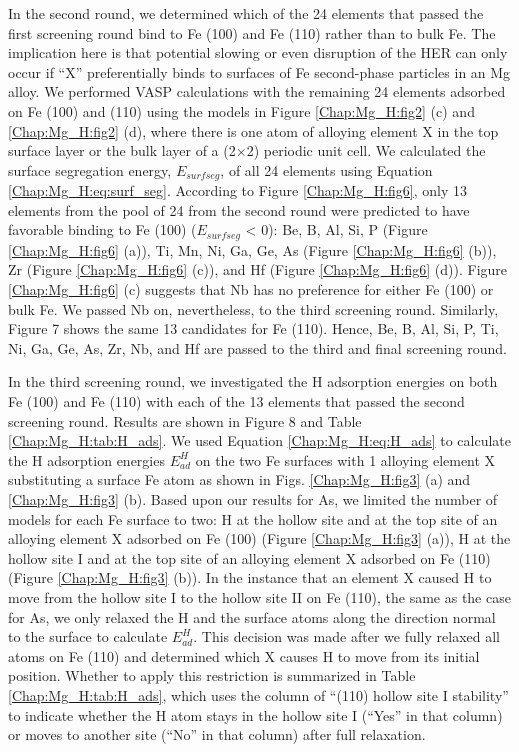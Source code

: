 In the second round, we determined which of the 24 elements that passed the first screening round bind to Fe (100) and Fe (110) rather than to bulk Fe. The implication here is that potential slowing or even disruption of the HER can only occur if ``X'' preferentially binds to surfaces of Fe second-phase particles in an Mg alloy. We performed \ac{VASP} calculations with the remaining 24 elements adsorbed on Fe (100) and (110) using the models in Figure \ref{Chap:Mg_H:fig2} (c) and \ref{Chap:Mg_H:fig2} (d), where there is one atom of alloying element X in the top surface layer or the bulk layer of a (2$\times$2) periodic unit cell. We calculated the surface segregation energy, $E_{surf seg}$, of all 24 elements using Equation \ref{Chap:Mg_H:eq:surf_seg}. According to Figure \ref{Chap:Mg_H:fig6}, only 13 elements from the pool of 24 from the second round were predicted to have favorable binding to Fe (100) ($E_{surf seg}$ < 0): Be, B, Al, Si, P (Figure \ref{Chap:Mg_H:fig6} (a)), Ti, Mn, Ni, Ga, Ge, As (Figure \ref{Chap:Mg_H:fig6} (b)), Zr (Figure \ref{Chap:Mg_H:fig6} (c)), and Hf (Figure \ref{Chap:Mg_H:fig6} (d)). Figure \ref{Chap:Mg_H:fig6} (c) suggests that Nb has no preference for either Fe (100) or bulk Fe. We passed Nb on, nevertheless, to the third screening round. Similarly, Figure 7 shows the same 13 candidates for Fe (110).  Hence, Be, B, Al, Si, P, Ti, Ni, Ga, Ge, As, Zr, Nb, and Hf are passed to the third and final screening round.





In the third screening round, we investigated the H adsorption energies on both Fe (100) and Fe (110) with each of the 13 elements that passed the second screening round. Results are shown in Figure 8 and Table \ref{Chap:Mg_H:tab:H_ads}. We used Equation \ref{Chap:Mg_H:eq:H_ads} to calculate the H adsorption energies $E_{ad}^H$ on the two Fe surfaces with 1 alloying element X substituting a surface Fe atom as shown in Figs. \ref{Chap:Mg_H:fig3} (a) and \ref{Chap:Mg_H:fig3} (b). Based upon our results for As, we limited the number of models for each Fe surface to two: H at the hollow site and at the top site of an alloying element X adsorbed on Fe (100) (Figure \ref{Chap:Mg_H:fig3} (a)), H at the hollow site I and at the top site of an alloying element X adsorbed on Fe (110) (Figure \ref{Chap:Mg_H:fig3} (b)). In the instance that an element X caused H to move from the hollow site I to the hollow site II on Fe (110), the same as the case for As, we only relaxed the H and the surface atoms along the direction normal to the surface to calculate $E_{ad}^H$. This decision was made after we fully relaxed all atoms on Fe (110) and determined which X causes H to move from its initial position. Whether to apply this restriction is summarized in Table \ref{Chap:Mg_H:tab:H_ads}, which uses the column of ``(110) hollow site I stability'' to indicate whether the H atom stays in the hollow site I (``Yes'' in that column) or moves to another site (``No'' in that column) after full relaxation.



